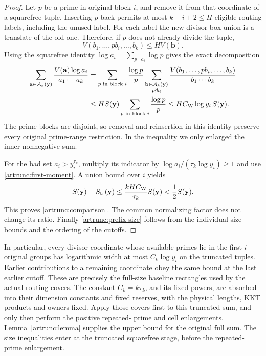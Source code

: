 \begin{proof}
Let $p$ be a prime in original block $i$, and remove it from that
coordinate of a squarefree tuple. Inserting $p$ back permits at most
$k-i+2\leq H$ eligible routing labels, including the unused label.
For each label the new divisor-box union is a translate of the old
one. Therefore, if $p$ does not already divide the tuple,
\begin{equation}
 V(b_1,\ldots,pb_i,\ldots,b_k)\leq H V(\mathbf b).
 \label{artrunc:slot-growth}
\end{equation}
Using the squarefree identity $\log a_i=\sum_{p\mid a_i}\log p$ gives
the exact decomposition
\begin{align}
 \sum_{\mathbf a\in\mathcal A_k(\mathbf y)}
       \frac{V(\mathbf a)\log a_i}{a_1\cdots a_k}
 &=\sum_{p\text{ in block }i}\frac{\log p}{p}
       \sum_{\substack{\mathbf b\in\mathcal A_k(\mathbf y)\\p\nmid b_i}}
       \frac{V(b_1,\ldots,pb_i,\ldots,b_k)}{b_1\cdots b_k}
       \notag\\
 &\leq H S(\mathbf y)
                \sum_{p\text{ in block }i}\frac{\log p}{p}
 \leq H C_{\rm W}\log y_i\,S(\mathbf y).
 \label{artrunc:first-moment}
\end{align}
The prime blocks are disjoint, so removal and reinsertion in this
identity preserve every original prime-range restriction. In the
inequality we only enlarged the inner nonnegative sum.

For the bad set $a_i>y_i^{\tau_k}$, multiply its indicator by
$\log a_i/(\tau_k\log y_i)\geq1$ and use
\eqref{artrunc:first-moment}. A union bound over $i$ yields
\[
 S(\mathbf y)-S_{\rm tr}(\mathbf y)
 \leq\frac{kH C_{\rm W}}{\tau_k}S(\mathbf y)
 <\frac12S(\mathbf y).
\]
This proves \eqref{artrunc:comparison}. The common normalizing factor
does not change its ratio. Finally \eqref{artrunc:prefix-size} follows
from the individual size bounds and the ordering of the cutoffs.
\end{proof}

In particular, every divisor coordinate whose available primes lie in
the first $i$ original groups has logarithmic width at most
$C_k\log y_i$ on the truncated tuples. Earlier contributions to a
remaining coordinate obey the same bound at the last earlier cutoff.
These are precisely the full-size baseline rectangles used by the
actual routing covers. The constant $C_k=k\tau_k$, and its fixed
powers, are absorbed into their dimension constants and fixed reserves,
with the physical lengths, KKT products and owners fixed. Apply those covers
first to this truncated sum, and only then perform the positive repeated-
prime and cell enlargements. Lemma~\ref{artrunc:lemma} supplies the upper
bound for the original full sum. The size inequalities enter at the
truncated squarefree stage, before the repeated-prime enlargement.
